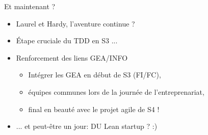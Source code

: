 \documentclass{beamer}
\begin{document}
\begin{frame}{Et maintenant ?}
  \begin{itemize}
    \item Laurel et Hardy, l'aventure continue ?
    \item Étape cruciale du TDD en S3 ...
    \item Renforcement des liens GEA/INFO
      \begin{itemize}
        \item Intégrer les GEA en début de S3 (FI/FC),
        \item équipes communes lors de la journée de l'entreprenariat,
        \item final en beauté avec le projet agile de S4 !
      \end{itemize}
    \item ... et peut-être un jour: DU Lean startup ? :)
  \end{itemize}
\end{frame}
\end{document}
